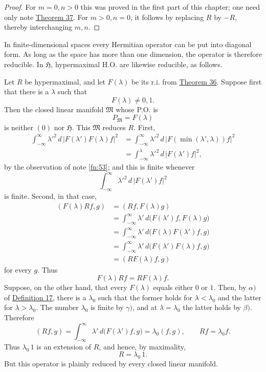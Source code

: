 ﻿\documentclass[paper=b5,fontsize=13pt,bookmarkpackage=false,twoside]{scrartcl}
\newcounter{translatornote}
\begin{document}
\begin{proof}
For $m=0,n>0$ this was proved in the first part of this chapter; one need only note \hyperref[thm:37]{Theorem 37}. For $m>0,n=0$, it follows by replacing $R$ by $-R$, thereby interchanging $m,n$.
\end{proof}

In finite-dimensional spaces every Hermitian operator can be put into diagonal form. As long as the space has more than one dimension, the operator is therefore reducible. In $\mathfrak H$, hypermaximal H.O. are likewise reducible, as follows.

Let $R$ be hypermaximal, and let $F(\lambda)$ be its r.i. from \hyperref[thm:36]{Theorem 36}. Suppose first that there is a $\lambda$ such that
\[
F(\lambda)\ne0,1.
\]
Then the closed linear manifold $\mathfrak M$ whose P.O. is
\[
P_{\mathfrak M}=F(\lambda)
\]
is neither $(0)$ nor $\mathfrak H$. This $\mathfrak M$ reduces $R$. First,
\begin{align*}
\int_{-\infty}^{\infty}\lambda'^2\,
d\,|F(\lambda')F(\lambda)f|^2
&=
\int_{-\infty}^{\infty}\lambda'^2\,
d\,|F(\min(\lambda',\lambda))f|^2\\
&=
\int_{-\infty}^{\lambda}\lambda'^2\,
d\,|F(\lambda')f|^2,
\end{align*}
by the observation of note \ref{fn:53}; and this is finite whenever
\[
\int_{-\infty}^{\infty}\lambda'^2\,d\,|F(\lambda')f|^2
\]
is finite. Second, in that case,
\begin{align*}
(F(\lambda)Rf,g)
&=(Rf,F(\lambda)g)\\
&=\int_{-\infty}^{\infty}\lambda'\,
d\bigl(F(\lambda')f,F(\lambda)g\bigr)\\
&=\int_{-\infty}^{\infty}\lambda'\,
d\bigl(F(\lambda)F(\lambda')f,g\bigr)\\
&=\int_{-\infty}^{\infty}\lambda'\,
d\bigl(F(\lambda')F(\lambda)f,g\bigr)\\
&=(RF(\lambda)f,g)
\end{align*}
for every $g$. Thus
\[
F(\lambda)Rf=RF(\lambda)f.
\]
Suppose, on the other hand, that every $F(\lambda)$ equals either $0$ or $1$. Then, by $\alpha)$ of \hyperref[def:17]{Definition 17}, there is a $\lambda_0$ such that the former holds for $\lambda<\lambda_0$ and the latter for $\lambda>\lambda_0$. The number $\lambda_0$ is finite by $\gamma)$, and at $\lambda=\lambda_0$ the latter holds by $\beta)$. Therefore
\[
(Rf,g)
=\int_{-\infty}^{\infty}\lambda'\,
d\bigl(F(\lambda')f,g\bigr)
=\lambda_0(f,g),
\qquad
Rf=\lambda_0f.
\]
Thus $\lambda_0\,1$ is an extension of $R$, and hence, by maximality,
\[
R=\lambda_0\,1.
\]
But this operator is plainly reduced by every closed linear manifold.
\end{document}
